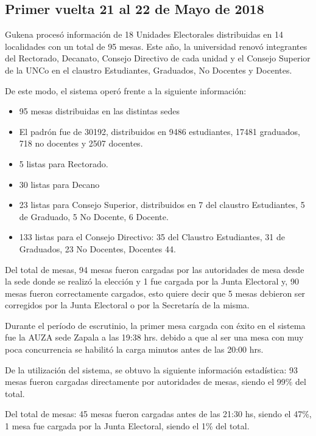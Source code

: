 \subsection{Primer vuelta 21 al 22 de Mayo de 2018}
Gukena procesó información de 18 Unidades Electorales distribuidas en 14 localidades con un total de 95 mesas. Este año, la universidad renovó integrantes del Rectorado, Decanato, Consejo Directivo de cada unidad y el Consejo Superior de la UNCo en el claustro Estudiantes, Graduados, No Docentes y Docentes.

De este modo, el sistema operó frente a la siguiente información:
\begin{itemize}
    \item 95 mesas distribuidas en las distintas sedes 
     \item El padrón fue de  30192, distribuidos en 9486 estudiantes, 17481 graduados, 718 no docentes y 2507 docentes.
     \item 5 listas para Rectorado.
     \item 30 listas para Decano
    \item 23 listas para Consejo Superior, distribuidos en 7 del claustro Estudiantes, 5 de Graduado, 5 No Docente, 6 Docente.
    \item 133 listas para el Consejo Directivo: 35 del Claustro Estudiantes, 31 de Graduados, 23 No Docentes, Docentes 44.
\end{itemize}
Del total de mesas, 94 mesas fueron cargadas por las autoridades de mesa desde la sede donde se realizó la elección y 1 fue cargada por la Junta Electoral y, 90 mesas fueron correctamente cargados, esto quiere decir que 5 mesas debieron ser corregidos por la Junta Electoral o por la Secretaría de la misma.

Durante el período de escrutinio, la primer mesa cargada con éxito en el sistema fue la AUZA sede Zapala a las 19:38 hrs. debido a que al ser una mesa con muy poca concurrencia se habilitó la carga minutos antes de las 20:00 hrs.

De la utilización del sistema, se obtuvo la siguiente información estadística:
93 mesas fueron cargadas directamente por autoridades de mesas, siendo el 99\% del total.

Del total de mesas:
45 mesas fueron cargadas antes de las 21:30 hs, siendo el 47\%,
1 mesa fue cargada 	por la Junta Electoral, siendo el 1\% del total.

